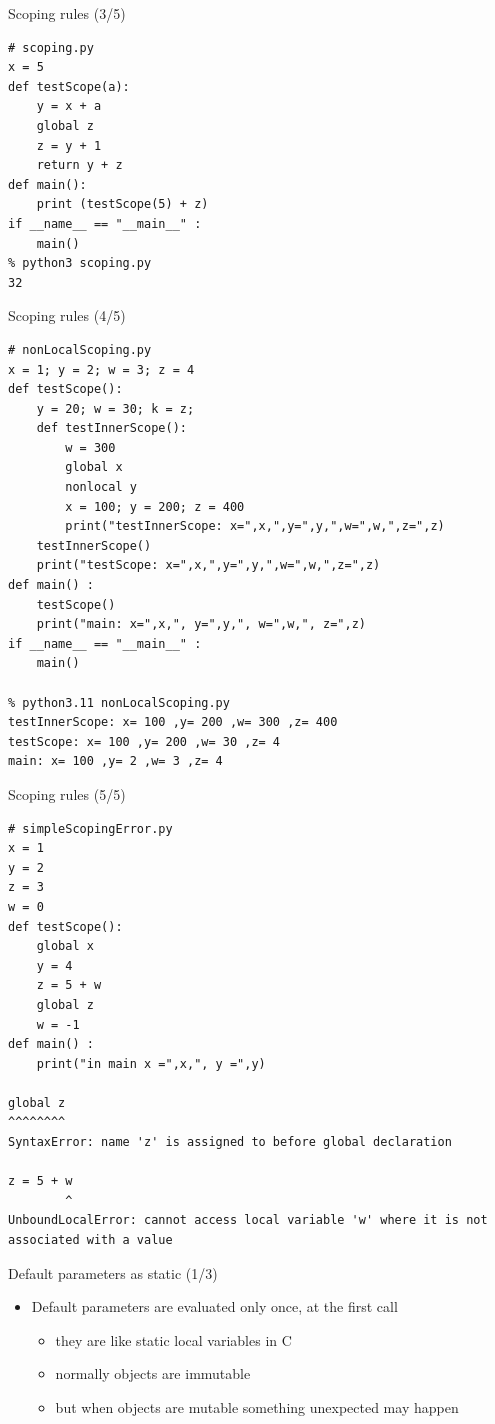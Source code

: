 \documentclass{beamer}
\begin{document}
\begin{frame}[fragile]
{\centerline{Scoping rules (3/5)}}
\begin{lstlisting}[style=myPythonStyle]
# scoping.py
x = 5
def testScope(a):
	y = x + a
	global z
	z = y + 1
	return y + z
def main():
	print (testScope(5) + z)
if __name__ == "__main__" :
	main()
% python3 scoping.py
32
\end{lstlisting}
\end{frame}

\begin{frame}[fragile]
{\centerline{Scoping rules (4/5)}}
\begin{lstlisting}[style=myPythonStyle]
# nonLocalScoping.py
x = 1; y = 2; w = 3; z = 4
def testScope():
	y = 20; w = 30; k = z;
	def testInnerScope():
		w = 300
		global x
		nonlocal y
		x = 100; y = 200; z = 400
		print("testInnerScope: x=",x,",y=",y,",w=",w,",z=",z)
	testInnerScope()
	print("testScope: x=",x,",y=",y,",w=",w,",z=",z)
def main() :
	testScope()
	print("main: x=",x,", y=",y,", w=",w,", z=",z)
if __name__ == "__main__" :
	main()
	
% python3.11 nonLocalScoping.py
testInnerScope: x= 100 ,y= 200 ,w= 300 ,z= 400
testScope: x= 100 ,y= 200 ,w= 30 ,z= 4
main: x= 100 ,y= 2 ,w= 3 ,z= 4

\end{lstlisting}
\end{frame}


\begin{frame}[fragile]
{\centerline{Scoping rules (5/5)}}
\begin{lstlisting}[style=myPythonStyle]
# simpleScopingError.py
x = 1
y = 2
z = 3
w = 0
def testScope():
	global x
	y = 4
	z = 5 + w
	global z
	w = -1
def main() :
	print("in main x =",x,", y =",y)

global z
^^^^^^^^
SyntaxError: name 'z' is assigned to before global declaration

z = 5 + w
        ^
UnboundLocalError: cannot access local variable 'w' where it is not associated with a value	
\end{lstlisting}
\end{frame}

\begin{frame}[fragile]
{\centerline{Default parameters as static (1/3)}}
\begin{itemize}
       \item Default parameters are evaluated only once, at the first call
       \begin{itemize}
		\item they are like static local variables in C
		\item normally objects are immutable
		\item but when objects are mutable something unexpected may happen
        \end{itemize}
    \end{itemize}
\end{frame}
\end{document}
